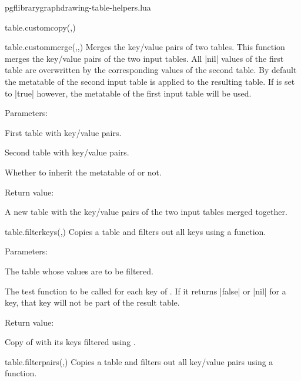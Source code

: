 \begin{filedescription}{pgflibrarygraphdrawing-table-helpers.lua}
\begin{luacommand}{{table.custom\textunderscore{}copy}(,)}
\end{luacommand}
\begin{luacommand}{{table.custom\textunderscore{}merge}(,,)}
Merges the key/value pairs of two tables.  This function merges the key/value pairs of the two input tables.  All |nil| values of the first table are overwritten by the corresponding values of the second table.  By default the metatable of the second input table is applied to the resulting table. If  is set to |true| however, the metatable of the first input table will be used. 

Parameters:
\begin{parameterdescription}
	\item[\meta{table1}] First table with key/value pairs.\item[\meta{table2}] Second table with key/value pairs.\item[\meta{first\_metatable}] Whether to inherit the metatable of  or not. 
\end{parameterdescription}


Return value:
\begin{parameterdescription} 
  \item[] A new table with the key/value pairs of the two input tables merged together. 
\end{parameterdescription}


\end{luacommand}
\begin{luacommand}{{table.filter\textunderscore{}keys}(,)}
Copies a table and filters out all keys using a function. 

Parameters:
\begin{parameterdescription}
	\item[\meta{table}] The table whose values are to be filtered.\item[\meta{filter\_func}] The test function to be called for each key of . If it returns |false| or |nil| for a key, that key will not be part of the result table. 
\end{parameterdescription}


Return value:
\begin{parameterdescription} 
  \item[] Copy of  with its keys filtered using . 
\end{parameterdescription}


\end{luacommand}
\begin{luacommand}{{table.filter\textunderscore{}pairs}(,)}
Copies a table and filters out all key/value pairs using a function. 


\end{luacommand}
\end{filedescription}
